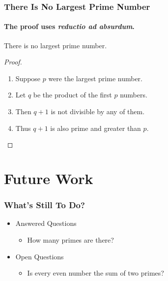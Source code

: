 \documentclass{beamer}
\begin{document}
\begin{frame}
\frametitle{There Is No Largest Prime Number}
\framesubtitle{The proof uses \textit{reductio ad absurdum}.}
\begin{theorem}
There is no largest prime number.
\end{theorem}
\begin{proof}
\begin{enumerate}
\item<1-| alert@1> Suppose $p$ were the largest prime number.
\item<2-> Let $q$ be the product of the first $p$ numbers.
\item<3-> Then $q+1$ is not divisible by any of them.
\item<4-> Thus $q+1$ is also prime and greater than $p$.\qedhere
\end{enumerate}
\end{proof}
\end{frame}

\section{Future Work}

\begin{frame}
\frametitle{What’s Still To Do?}
\begin{itemize}
\item Answered Questions
\begin{itemize}
\item How many primes are there?
\end{itemize}
\item Open Questions
\begin{itemize}
\item Is every even number the sum of two primes?
\end{itemize}
\end{itemize}
\end{frame}
\end{document}
